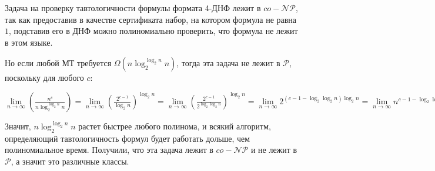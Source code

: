 \documentclass[a4paper,12pt]{article} %
\begin{document}
Задача на проверку тавтологичности формулы формата 4-ДНФ лежит в $co-\mathcal{NP}$, так как предоставив в качестве сертификата набор, на котором формула не равна $1$, подставив его в ДНФ можно полиномиально проверить, что формула не лежит в этом языке.

Но если любой МТ требуется $\Omega(n\log_2^{\log_2 n}n)$, тогда эта задача не лежит в $\mathcal{P}$, поскольку для любого $c$:

$\lim\limits_{n\rightarrow\infty}(\frac{n^c}{n\log_2^{\log_2 n}n})=\lim\limits_{n\rightarrow\infty}(\frac{2^{c-1}}{\log_2 n})^{\log_2 n}=\lim\limits_{n\rightarrow\infty}(\frac{2^{c-1}}{2^{\log_2{\log_2 n}}})^{\log_2 n}=\lim\limits_{n\rightarrow\infty}2^{(c-1-\log_2{\log_2 n})\log_2 n}=\lim\limits_{n\rightarrow\infty}n^{c-1-\log_2{\log_2 n}}=\lim\limits_{n\rightarrow\infty}(\frac{1}{n})^{\log_2{\log_2 n}-c+1}=0$

Значит, $n\log_2^{\log_2 n}n$ растет быстрее любого полинома, и всякий алгоритм, определяющий тавтологичность формул будет работать дольше, чем полиномиальное время. Получили, что эта задача лежит в $co-\mathcal{NP}$ и не лежит в $\mathcal{P}$, а значит это различные классы.
\end{document}
